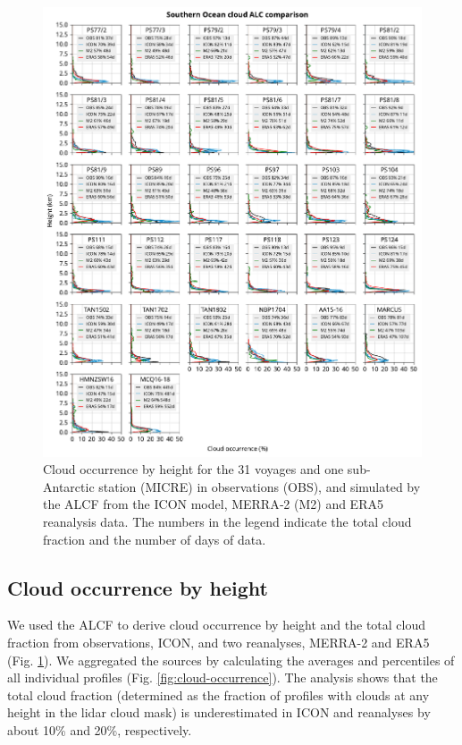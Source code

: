\documentclass[12pt,a4paper]{article}
\begin{document}
\begin{figure}
\centerline{
\includegraphics[width=1.06\textwidth]{img/cloud_occurrence_panel.pdf}
}
\caption{Cloud occurrence by height for the 31 voyages and one sub-Antarctic
station (MICRE) in observations (OBS), and simulated by the ALCF from the
ICON model, MERRA‐2 (M2) and ERA5 reanalysis data. The numbers in the legend
indicate the total cloud fraction and the number of days of data.}
\label{fig:cloud-occurrence-panel}
\end{figure}

\subsection{Cloud occurrence by height}

We used the ALCF to derive cloud occurrence by height and the total cloud
fraction from observations, ICON, and two reanalyses, MERRA-2 and ERA5 (Fig.
\ref{fig:cloud-occurrence-panel}). We aggregated the sources by calculating the
averages and percentiles of all individual profiles (Fig.
\ref{fig:cloud-occurrence}). The analysis shows that the total cloud fraction
(determined as the fraction of proﬁles with clouds at any height in the lidar
cloud mask) is underestimated in ICON and reanalyses by about 10\% and 20\%,
respectively.
\end{document}
